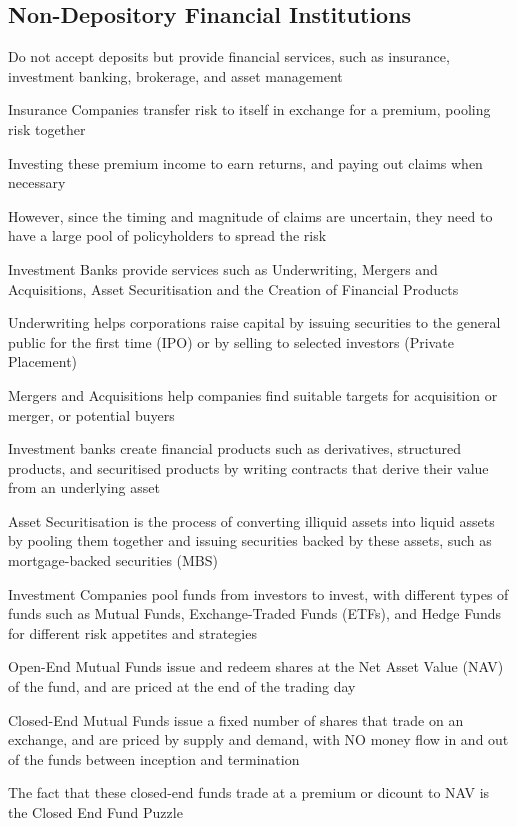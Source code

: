 \subsection{Non-Depository Financial Institutions}
Do not accept deposits but provide financial services, such as insurance, investment banking, brokerage, and asset management

Insurance Companies transfer risk to itself in exchange for a premium, pooling risk together

Investing these premium income to earn returns, and paying out claims when necessary

However, since the timing and magnitude of claims are uncertain, they need to have a large pool of policyholders to spread the risk


Investment Banks provide services such as Underwriting, Mergers and Acquisitions, Asset Securitisation and the Creation of Financial Products

Underwriting helps corporations raise capital by issuing securities to the general public for the first time (IPO) or by selling to selected investors (Private Placement)

Mergers and Acquisitions help companies find suitable targets for acquisition or merger, or potential buyers

Investment banks create financial products such as derivatives, structured products, and securitised products by 
writing contracts that derive their value from an underlying asset

Asset Securitisation is the process of converting illiquid assets into liquid assets by pooling them together and issuing securities backed by these assets, such as mortgage-backed securities (MBS)


Investment Companies pool funds from investors to invest, with different types of funds such as Mutual Funds, Exchange-Traded Funds (ETFs), and Hedge Funds for different risk appetites and strategies

Open-End Mutual Funds issue and redeem shares at the Net Asset Value (NAV) of the fund, and are priced at the end of the trading day

Closed-End Mutual Funds issue a fixed number of shares that trade on an exchange, and are priced by supply and demand, with NO money flow in and out of the funds between inception and termination
\begin{callout}
    The fact that these closed-end funds trade at a premium or dicount to NAV is the Closed End Fund Puzzle
\end{callout}

